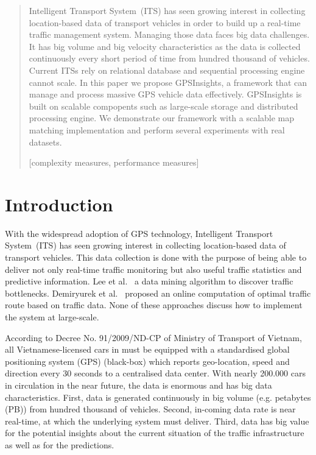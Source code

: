 \documentclass{acm_proc_article-sp}
\begin{document}
\maketitle
\begin{abstract}
Intelligent Transport System~(ITS) has seen growing interest in collecting location-based data of transport vehicles in order to build up a real-time traffic management system. Managing those data faces big data challenges. It has big volume and big velocity characteristics as the data is collected continuously every short period of time from hundred thousand of vehicles. Current ITSs rely on relational database and sequential processing engine cannot scale. In this paper we propose GPSInsights, a framework that can manage and process massive GPS vehicle data effectively. GPSInsights is built on scalable compopents such as large-scale storage and distributed processing engine. We demonstrate our framework with a scalable map matching implementation and perform several experiments with real datasets. 

[complexity measures, performance measures]


\end{abstract}

\section{Introduction}


With the widespread adoption of GPS technology, Intelligent Transport System~(ITS) has seen growing interest in collecting location-based data of transport vehicles. This data collection is done with the purpose of being able to deliver not only real-time traffic monitoring but also useful traffic statistics and predictive information. Lee et al.~\cite{Lee2011} a data mining algorithm to discover traffic bottlenecks. Demiryurek et al.~\cite{Demiryurek2010} proposed an online computation of optimal traffic route based on traffic data. None of these approaches discuss how to implement the system at large-scale.


According to Decree No. 91/2009/ND-CP of Ministry of Transport of Vietnam, all Vietnamese-licensed cars in must be equipped with a standardised global positioning system (GPS) (black-box) which reports geo-location, speed and direction every 30 seconds to a centralised data center. With nearly 200.000 cars in circulation in the near future, the data is enormous and has big data characteristics. First, data is generated continuously in big volume (e.g. petabytes (PB)) from hundred thousand of vehicles. Second, in-coming data rate is near real-time, at which the underlying system must deliver. Third, data has big value for the potential insights about the current situation of the traffic infrastructure as well as for the predictions. 
\end{document}

